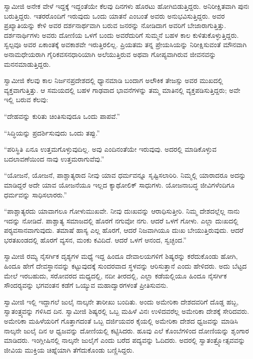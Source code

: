  ಸ್ವಾಮೀಜಿ ಅನೇಕ ವೇಳೆ ಇದ್ದಕ್ಕೆ ಇದ್ದಂತೆಯೇ ಕೆಲವು ದಿನಗಳು ಹೊರಟು ಹೋಗಿಬಿಡುತ್ತಿದ್ದರು. ಅನಿರೀಕ್ಷಿತವಾಗಿ ಪುನಃ ಬರುತ್ತಿದ್ದರು. ಇತರರೊಂದಿಗೆ ಇರುವುದು ಒಂದು ಯಾತನೆ ಎಂಬಂತೆ ಅವರು ಅನುಭವಿಸುತ್ತಿದ್ದರು. ಅವರ ಪ್ರಖ್ಯಾತಿಯನ್ನು ಕೇಳಿ ಅವರ ದರ್ಶನಾರ್ಥವಾಗಿ ಬರುವ ಜನರನ್ನು ನೋಡಿದಾಗ ಅವರಿಗೆ ಬೇಜಾರಾಗುತ್ತಿತ್ತು. ದರ್ಶನಾರ್ಥಿಗಳು ಅವರು ದೋಣಿಯ ಒಳಗೆ ಬಂದು ಅವರೆದುರಿಗೆ ಸುಮ್ಮನೆ ಬಹಳ ಕಾಲ ಕುಳಿತುಕೊಳ್ಳುತ್ತಿದ್ದರು. ಸ್ವಲ್ಪವೂ ಅವರ ಏಕಾಂತಕ್ಕೆ ಅವಕಾಶವೇ ಇರುತ್ತಿರಲಿಲ್ಲ. ಪ್ರಿಯತಮ ತನ್ನ ಪ್ರೇಯಸಿಯನ್ನು ನಿರೀಕ್ಷಿಸುವಂತೆ ಮೌನವಾಗಿ ಅನಾಮಧೇಯರಾಗಿ ಗೈರಿಕವಸನಧಾರಿಯಾಗಿ ಅಲೆಯುತ್ತಿರುವ ಅಥವಾ ಗೋಪ್ಯವಾಗಿರುವ ಜೀವನವನ್ನು ಮನನಮಾಡುತ್ತಿದ್ದರು. 

 ಸ್ವಾಮೀಜಿ ಕೆಲವು ಕಾಲ ನಿರ್ಜನಪ್ರದೇಶದಲ್ಲಿ ಧ್ಯಾನಮಾಡಿ ಬಂದಾಗ ಅಲೌಕಿಕ ತೇಜಸ್ಸು ಅವರ ಮುಖದಲ್ಲಿ ವ್ಯಕ್ತವಾಗುತ್ತಿತ್ತು. ಆ ಸಮಯದಲ್ಲಿ ಬಹಳ ಗಾಢವಾದ ಭಾವನೆಗಳನ್ನು ತಮ್ಮ ಮಾತಿನಲ್ಲಿ ವ್ಯಕ್ತಪಡಿಸುತ್ತಿದ್ದರು; ಅವೇ ಇಲ್ಲಿ ಬರುವ ಕೆಲವು: 

 “ದೇಹವನ್ನು ಕುರಿತು ಚಿಂತಿಸುವುದೂ ಒಂದು ಪಾಪವೆ.” 

 “ಸಿದ್ಧಿಯನ್ನು ಪ್ರದರ್ಶಿಸುವುದು ಒಂದು ತಪ್ಪು.” 

 “ಪರಿಸ್ಥಿತಿ ಏನೂ ಉತ್ತಮಗೊಳ್ಳುವುದಿಲ್ಲ. ಅವು ಎಂದಿನಂತೆಯೇ ಇರುವುವು. ಅದರಲ್ಲಿ ಮಾಡಿಕೊಳ್ಳುವ ಬದಲಾವಣೆಯಿಂದ ನಾವು ಉತ್ತಮರಾಗುವೆವು.” 

 “ಯೋಜನೆ, ಯೋಜನೆ, ಪಾಶ್ಚಾತ್ಯರಾದ ನೀವು ಯಾವ ಧರ್ಮವನ್ನೂ ಸೃಷ್ಟಿಸಲಾರಿರಿ. ನಿಮ್ಮಲ್ಲಿ ಯಾರಾದರೂ ಅದನ್ನು ಮಾಡಿದ್ದರೆ ಅದೇ ಯಾವ ಯೋಜನೆಯೂ ಇಲ್ಲದ ಕ್ಯಾಥೋಲಿಕ್ ಸಾಧುಗಳು. ಯೋಜನಾಬದ್ಧ ಜೀವಿಗಳೆಂದಿಗೂ ಧರ್ಮವನ್ನು ಸಾಧಿಸಲಾರರು.” 

 “ಪಾಶ್ಚಾತ್ಯರದು ಯಾವಾಗಲೂ ಗೋಳುಮುಖವೇ. ನೀವು ದುಃಖವನ್ನು ಆರಾಧಿಸುತ್ತೀರಿ. ನಿಮ್ಮ ದೇಶದಲ್ಲೆಲ್ಲ ನಾನು ಇದನ್ನು ನೋಡಿದೆ. ಪಾಶ್ಚಾತ್ಯ ಸಮಾಜದಲ್ಲಿ ಹೊರಗೆ ನಗುವೋ ನಗು. ಆದರೆ ಒಳಗೆ ಗೋಳು. ಎಲ್ಲಾ ದುಃಖದಲ್ಲಿ ಪರ‍್ಯವಸಾನವಾಗುವುದು. ತಮಾಷೆ ಹಾಸ್ಯ ಎಲ್ಲ ಹೊರಗೆ, ಆದರೆ ನಿಜವಾಗಿಯೂ ದುಃಖ ಬೇಯುತ್ತಿರುವುದು. ಆದರೆ ಭರತಖಂಡದಲ್ಲಿ ಹೊರಗೆ ವ್ಯಸನ, ಮಂಕು ಕವಿದಿದೆ. ಆದರೆ ಒಳಗೆ ಆನಂದ, ಸ್ವಚ್ಛಂದ.” 

 ಸ್ವಾಮೀಜಿ ರಮ್ಯ ನೈಸರ್ಗಿಕ ದೃಶ್ಯಗಳ ಮಧ್ಯೆ ಇದ್ದ ಹಿಂದೂ ದೇವಾಲಯಗಳಿಗೆ ಶಿಷ್ಯರನ್ನು ಕರೆದುಕೊಂಡು ಹೋಗಿ, ಹಿಂದೂ ಹೇಗೆ ದೇವಸ್ಥಾನವನ್ನು ಕಟ್ಟುವುದಕ್ಕೆ ಸುಂದರವಾದ ಸ್ಥಳವನ್ನು ಆರಿಸುತ್ತಾನೆ ಎಂದು ಹೇಳಿದರು. ಅದು ಬೆಟ್ಟದ ಮೇಲೆ ಇರಬಹುದು, ಸರೋವರದ ಮಧ್ಯದಲ್ಲಿ, ನದೀ ತೀರದಲ್ಲಿ, ಎಲ್ಲಾ ಕಡೆಯಲ್ಲಿಯೂ ಹಿಂದೂ ನೈಸರ್ಗಿಕ ಸೌಂದರ‍್ಯವನ್ನು ಭಗವಂತನ ಕಡೆಗೆ ಒಯ್ಯುವ ಮಹಾದ್ವಾರಗಳಂತೆ ಪ್ರೀತಿಸುವನು. 

 ಸ್ವಾಮೀಜಿ ಇಲ್ಲಿ ಇದ್ದಾಗಲೆ ಜುಲೈ ನಾಲ್ಕನೇ ತಾರೀಖು ಬಂದಿತು. ಅಂದು ಅಮೇರಿಕಾ ದೇಶದವರಿಗೆ ದೊಡ್ಡ ಹಬ್ಬ, ಸ್ವಾತಂತ್ರ್ಯವನ್ನು ಗಳಿಸಿದ ದಿನ. ಸ್ವಾಮೀಜಿ ಶಿಷ್ಯರಲ್ಲಿ ಒಬ್ಬ ಮಹಿಳೆ ವಿನಃ ಉಳಿದವರೆಲ್ಲ ಅಮೇರಿಕಾ ದೇಶಕ್ಕೆ ಸೇರಿದವರು. ಅಮೇರಿಕಾ ಮಹಿಳೆಯರಿಗೆ ಗೊತ್ತಾಗದಂತೆ ಒಬ್ಬ ದರ್ಜಿಯವರ ಕೈಯಲ್ಲಿ ಅಮೇರಿಕಾ ದೇಶದ ಧ್ವಜವನ್ನು ಮಾಡಿಸಿ ನಾಲ್ಕನೇ ಜುಲೈ ದಿನ ಆ ಧ್ವಜವನ್ನು ದೋಣಿಯಲ್ಲಿ ಕಟ್ಟಿಸಿದರು. ಹೂವು ಎಲೆ ಕೊಂಬೆಗಳಿಂದ ದೋಣಿಯನ್ನು ಶೃಂಗಾರ ಮಾಡಿದರು. ಇಂಗ್ಲೀಷಿನಲ್ಲಿ ನಾಲ್ಕನೇ ಜುಲೈಗೆ ಎಂದು ಬರೆದ ಪದ್ಯವನ್ನು ಓದಿದರು. ಅದರಲ್ಲಿ ಸ್ವಾತಂತ್ರ್ಯೋತ್ಸವವನ್ನು ಜೀವಿಯ ಮುಕ್ತಿಯ ಚಿಹ್ನೆಯಾಗಿ ತೆಗೆದುಕೊಂಡು ಬಣ್ಣಿಸಿದ್ದರು. 

